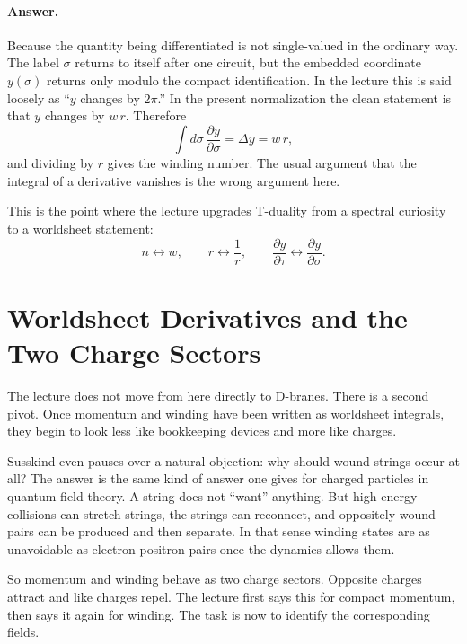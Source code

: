 \paragraph{Answer.} Because the quantity being differentiated is not single-valued in the ordinary way. The label \(\sigma\) returns to itself after one circuit, but the embedded coordinate \(y(\sigma)\) returns only modulo the compact identification. In the lecture this is said loosely as ``\(y\) changes by \(2\pi\).'' In the present normalization the clean statement is that \(y\) changes by \(w\,r\). Therefore
\begin{equation}
\int d\sigma\,\frac{\partial y}{\partial \sigma}=\Delta y=w\,r,
\end{equation}
and dividing by \(r\) gives the winding number. The usual argument that the integral of a derivative vanishes is the wrong argument here.

This is the point where the lecture upgrades T-duality from a spectral curiosity to a worldsheet statement:
\begin{equation}
n \leftrightarrow w, \qquad
r \leftrightarrow \frac{1}{r}, \qquad
\frac{\partial y}{\partial \tau} \leftrightarrow \frac{\partial y}{\partial \sigma}.
\end{equation}

\section{Worldsheet Derivatives and the Two Charge Sectors}

The lecture does not move from here directly to D-branes. There is a second pivot. Once momentum and winding have been written as worldsheet integrals, they begin to look less like bookkeeping devices and more like charges.

Susskind even pauses over a natural objection: why should wound strings occur at all? The answer is the same kind of answer one gives for charged particles in quantum field theory. A string does not ``want'' anything. But high-energy collisions can stretch strings, the strings can reconnect, and oppositely wound pairs can be produced and then separate. In that sense winding states are as unavoidable as electron-positron pairs once the dynamics allows them.

So momentum and winding behave as two charge sectors. Opposite charges attract and like charges repel. The lecture first says this for compact momentum, then says it again for winding. The task is now to identify the corresponding fields.

